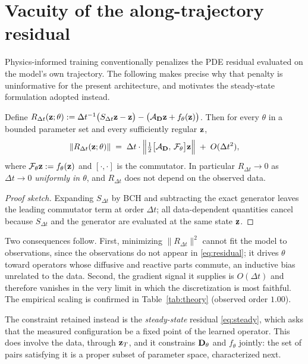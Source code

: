 \section{Vacuity of the along-trajectory residual}
\label{app:vacuity}

Physics-informed training conventionally penalizes the PDE residual evaluated on
the model's own trajectory. The following makes precise why that penalty is
uninformative for the present architecture, and motivates the steady-state
formulation adopted instead.

\begin{proposition}
\label{prop:vacuity}
Define $R_{\Delta t}(\mathbf{z};\theta) := \Delta t^{-1}\big(S_{\Delta t}\mathbf{z} - \mathbf{z}\big)
- \big(\mathcal{A}_{\mathbf{D}}\mathbf{z} + f_\theta(\mathbf{z})\big)$. Then for every
$\theta$ in a bounded parameter set and every sufficiently regular $\mathbf{z}$,
\begin{equation}
\|R_{\Delta t}(\mathbf{z};\theta)\| \;=\; \Delta t \cdot
\Big\| \tfrac{1}{2}\big[\mathcal{A}_{\mathbf{D}},\,\mathcal{F}_\theta\big]\mathbf{z} \Big\|
\;+\; O(\Delta t^2),
\label{eq:residual}
\end{equation}
where $\mathcal{F}_\theta \mathbf{z} := f_\theta(\mathbf{z})$ and $[\cdot,\cdot]$ is the
commutator. In particular $R_{\Delta t}\to0$ as $\Delta t\to0$ \emph{uniformly in
$\theta$}, and $R_{\Delta t}$ does not depend on the observed data.
\end{proposition}

\begin{proof}[Proof sketch]
Expanding $S_{\Delta t}$ by BCH and subtracting the exact generator leaves the
leading commutator term at order $\Delta t$; all data-dependent quantities cancel
because $S_{\Delta t}$ and the generator are evaluated at the same state $\mathbf{z}$.
\end{proof}

Two consequences follow. First, minimizing
$\|R_{\Delta t}\|^2$ cannot fit the model to observations, since the observations
do not appear in \eqref{eq:residual}; it drives $\theta$ toward operators whose
diffusive and reactive parts commute, an inductive bias unrelated to the data.
Second, the gradient signal it supplies is $O(\Delta t)$ and therefore vanishes
in the very limit in which the discretization is most faithful. The empirical
scaling is confirmed in Table~\ref{tab:theory} (observed order $1.00$).

The constraint retained instead is the \emph{steady-state} residual
\eqref{eq:steady}, which asks that the measured configuration be a fixed point of
the learned operator. This does involve the data, through $\mathbf{z}_T$, and it
constrains $\mathbf{D}_\theta$ and $f_\theta$ jointly: the set of pairs satisfying it is
a proper subset of parameter space, characterized next.

